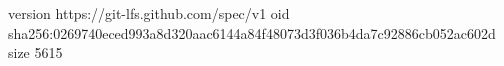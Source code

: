 version https://git-lfs.github.com/spec/v1
oid sha256:0269740eced993a8d320aac6144a84f48073d3f036b4da7c92886cb052ac602d
size 5615
